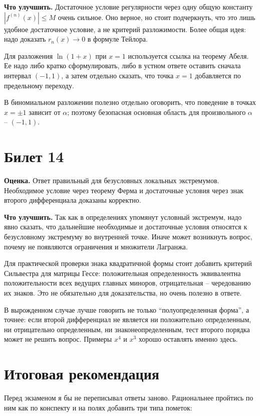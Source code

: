 \documentclass[12pt,a4paper]{article}
\begin{document}
\textbf{Что улучшить.}
Достаточное условие регулярности через одну общую константу
\(|f^{(n)}(x)|\le M\) очень сильное. Оно верное, но стоит подчеркнуть, что
это лишь удобное достаточное условие, а не критерий разложимости. Более общая
идея: надо доказать \(r_n(x)\to0\) в формуле Тейлора.

Для разложения \(\ln(1+x)\) при \(x=1\) используется ссылка на теорему
Абеля. Ее надо либо кратко сформулировать, либо в устном ответе оставить
сначала интервал \((-1,1)\), а затем отдельно сказать, что точка \(x=1\)
добавляется по предельному переходу.

В биномиальном разложении полезно отдельно оговорить, что поведение в
точках \(x=\pm1\) зависит от \(\alpha\); поэтому безопасная основная область
для произвольного \(\alpha\) -- \((-1,1)\).

\section*{Билет 14}

\textbf{Оценка.} Ответ правильный для безусловных локальных экстремумов.
Необходимое условие через теорему Ферма и достаточные условия через знак
второго дифференциала доказаны корректно.

\textbf{Что улучшить.}
Так как в определениях упомянут условный экстремум, надо явно сказать, что
дальнейшие необходимые и достаточные условия относятся к безусловному
экстремуму во внутренней точке. Иначе может возникнуть вопрос, почему не
появляются ограничения и множители Лагранжа.

Для практической проверки знака квадратичной формы стоит добавить критерий
Сильвестра для матрицы Гессе: положительная определенность эквивалентна
положительности всех ведущих главных миноров, отрицательная -- чередованию
их знаков. Это не обязательно для доказательства, но очень полезно в ответе.

В вырожденном случае лучше говорить не только ``полуопределенная форма'', а
точнее: если второй дифференциал не является ни положительно определенным, ни
отрицательно определенным, ни знаконеопределенным, тест второго порядка может
не решить вопрос. Примеры \(x^4\) и \(x^3\) хорошо оставлять именно здесь.

\section*{Итоговая рекомендация}

Перед экзаменом я бы не переписывал ответы заново. Рациональнее пройтись по
ним как по конспекту и на полях добавить три типа пометок:
\end{document}
